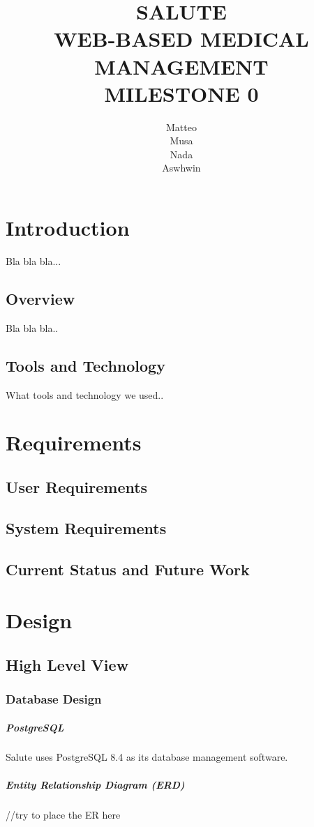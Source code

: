 \documentclass[12pt]{report}
\title{SALUTE \\ WEB-BASED MEDICAL MANAGEMENT \\ MILESTONE 0}
\author{Matteo \\ Musa \\ Nada \\ Aswhwin}
\begin{document}
\maketitle
\tableofcontents


\chapter{Introduction}
Bla bla bla...
\section{Overview}
Bla bla bla..
\section{Tools and Technology}
What tools and technology we used..


\chapter{Requirements}
\section{User Requirements}
\section{System Requirements}
\section{Current Status and Future Work}


\chapter{Design}
\section{High Level View}
\subsection{Database Design}
\paragraph{PostgreSQL}
Salute uses PostgreSQL 8.4 as its database management software.

\paragraph{Entity Relationship Diagram (ERD)}
//try to place the ER here
\end{document}
